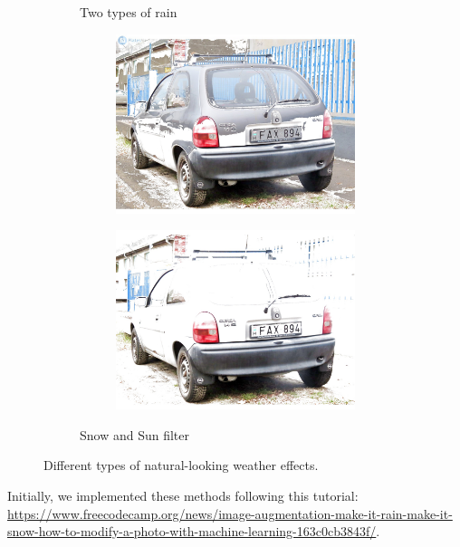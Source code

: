 \begin{figure}
\begin{subfigure}[b]{\textwidth}
\begin{subfigure}[b]{.45\textwidth}
        \end{subfigure}
        \hfill
        \caption{Two types of rain}
        \label{fig:weather-raines}
    \end{subfigure}
    \begin{subfigure}[b]{\textwidth}
        \begin{subfigure}[b]{.45\textwidth}
            \includegraphics[width=\textwidth]{figures/snow.jpg}
        \end{subfigure}
        \hfill
        \begin{subfigure}[b]{.45\textwidth}
            \includegraphics[width=\textwidth]{figures/sunny.jpg}
        \end{subfigure}
        \hfill
        \caption{Snow and Sun filter}
        \label{fig:weather-snow-sun}
    \end{subfigure}
    \caption{Different types of natural-looking weather effects.}
    \label{fig:weather-effects}
\end{figure}

Initially, we implemented these methods following this tutorial: 
\url{https://www.freecodecamp.org/news/image-augmentation-make-it-rain-make-it-snow-how-to-modify-a-photo-with-machine-learning-163c0cb3843f/}.

